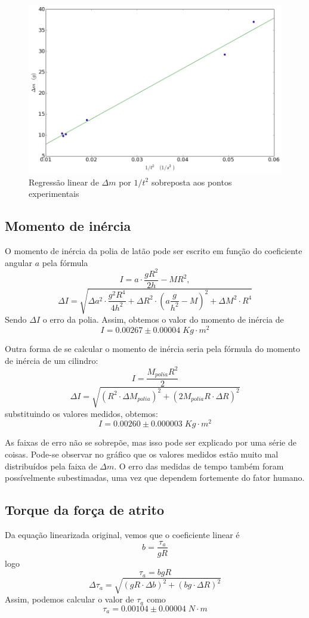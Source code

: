 \documentclass[12pt,a4paper]{article}
\begin{document}
\begin{figure}
\includegraphics[scale=0.55]{grafico.png}
\caption{Regressão linear de $\Delta m$ por $1/t^2$ sobreposta aos pontos experimentais}
\label{grafico}
\end{figure}

\subsection{Momento de inércia}
O momento de inércia da polia de latão pode ser escrito em função do coeficiente angular $a$ pela fórmula 
$$I = a\cdot\frac{gR^2}{2h}-MR^2,$$
$$\Delta I = \sqrt{\Delta a^2 \cdot \frac{g^2R^4}{4h^2} + \Delta R^2 \cdot (a\frac{g}{h^2} - M)^2 + \Delta M^2\cdot R^4}$$
Sendo $\Delta I$ o erro da polia.
Assim, obtemos o valor do momento de inércia de 
$$ I = 0.00267 \pm 0.00004 \; Kg \cdot m^2 $$ 

Outra forma de se calcular o momento de inércia seria pela fórmula do momento de inércia de um cilindro:
$$ I = \frac{M_{polia}R^2}{2} $$
$$ \Delta I = \sqrt{(R^2 \cdot \Delta M_{polia})^2 + (2M_{polia}R \cdot \Delta R)^2} $$
substituindo os valores medidos, obtemos:
$$ I = 0.00260 \pm 0.000003 \; Kg \cdot m^2 $$

As faixas de erro não se sobrepõe, mas isso pode ser explicado por uma série de coisas. Pode-se observar no gráfico que os valores medidos estão muito mal distribuídos pela faixa de $ \Delta m $. O erro das medidas de tempo também foram possívelmente subestimadas, uma vez que dependem fortemente do fator humano. 

\subsection{Torque da força de atrito}
Da equação linearizada original, vemos que o coeficiente linear é 
$$ b = \frac{\tau_a}{gR} $$
logo 
$$ \tau_a = bgR $$
$$ \Delta \tau_a = \sqrt{(gR \cdot \Delta b)^2 + (bg \cdot \Delta R)^2} $$
Assim, podemos calcular o valor de $\tau_a$ como 
$$ \tau_a =  0.00104 \pm 0.00004 \; N \cdot m $$
\end{document}
